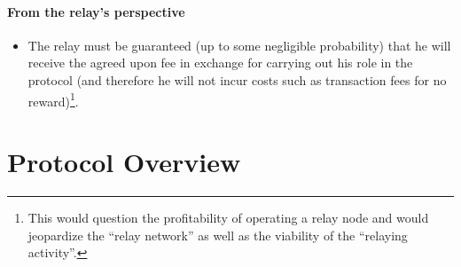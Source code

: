 \paragraph{From the relay's perspective}

\begin{itemize}
  \item The relay must be guaranteed (up to some negligible probability) that he will receive the agreed upon fee in exchange for carrying out his role in the protocol (and therefore he will not incur costs such as transaction fees for no reward)\footnote{This would question the profitability of operating a relay node and would jeopardize the ``relay network'' as well as the viability of the ``relaying activity''.}.
\end{itemize}

\section{Protocol Overview}\label{relay-proof-permission:protocol-overvew}



